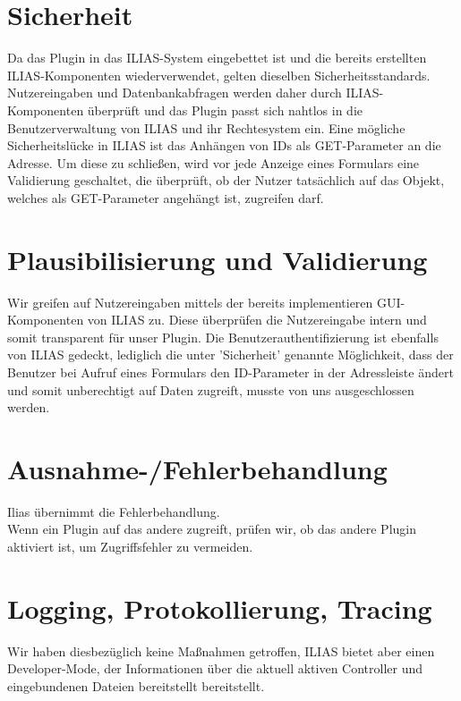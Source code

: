 \documentclass[a4paper]{scrreprt}
\begin{document}
\section{Sicherheit}

Da das Plugin in das ILIAS-System eingebettet ist und die bereits erstellten ILIAS-Komponenten wiederverwendet, gelten dieselben Sicherheitsstandards. 
Nutzereingaben und Datenbankabfragen werden daher durch ILIAS-Komponenten überprüft und das Plugin passt sich nahtlos in die Benutzerverwaltung von ILIAS und ihr Rechtesystem ein. 
Eine mögliche Sicherheitslücke in ILIAS ist das Anhängen von IDs als GET-Parameter an die Adresse. 
Um diese zu schließen, wird vor jede Anzeige eines Formulars eine Validierung geschaltet, die überprüft, ob der Nutzer tatsächlich auf das Objekt, welches als GET-Parameter angehängt ist, zugreifen darf.

\section{Plausibilisierung und Validierung}

Wir greifen auf Nutzereingaben mittels der bereits implementieren GUI-Komponenten von ILIAS zu. 
Diese überprüfen die Nutzereingabe intern und somit transparent für unser Plugin. 
Die Benutzerauthentifizierung ist ebenfalls von ILIAS gedeckt, lediglich die unter 'Sicherheit' genannte Möglichkeit, dass der Benutzer bei Aufruf eines Formulars den ID-Parameter in der Adressleiste ändert und somit unberechtigt auf Daten zugreift, musste von uns ausgeschlossen werden.

\section{Ausnahme-/Fehlerbehandlung}

Ilias übernimmt die Fehlerbehandlung.\\
Wenn ein Plugin auf das andere zugreift, prüfen wir, ob das andere Plugin aktiviert ist, um Zugriffsfehler zu vermeiden.

\section{Logging, Protokollierung, Tracing}

Wir haben diesbezüglich keine Maßnahmen getroffen, ILIAS bietet aber einen Developer-Mode, der Informationen über die aktuell aktiven Controller und eingebundenen Dateien bereitstellt bereitstellt.
\end{document}
